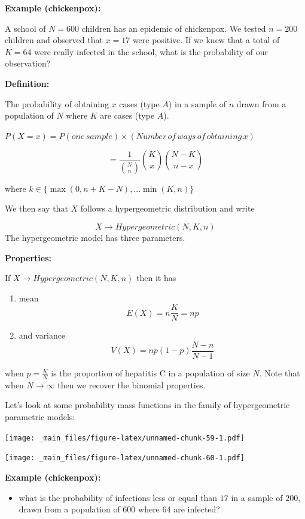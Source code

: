 \documentclass[
]{book}
\providecommand{\tightlist}{%
  \setlength{\itemsep}{0pt}\setlength{\parskip}{0pt}}
\begin{document}
\textbf{Example (chickenpox):}

A school of \(N=600\) children has an epidemic of chickenpox. We tested \(n=200\) children and observed that \(x=17\) were positive. If we knew that a total of \(K=64\) were really infected in the school, what is the probability of our observation?

\textbf{Definition:}

The probability of obtaining \(x\) cases (type \(A\)) in a sample of \(n\) drawn from a population of \(N\) where \(K\) are cases (type \(A\)).

\(P(X=x)=P(one\,sample) \times (Number\, of\, ways\, of\, obtaining\, x)\)

\[=\frac{1}{\binom N n}\binom K x \binom {N-K} {n-x}\]

where \(k \in \{\max(0, n+K-N), ... \min(K, n) \}\)

We then say that \(X\) follows a hypergeometric distribution and write

\[X \rightarrow Hypergeometric(N,K,n)\]
The hypergeometric model has three parameters.

\textbf{Properties:}

If \(X \rightarrow Hypergeometric(N,K,n)\) then it has

\begin{enumerate}
\def\labelenumi{\arabic{enumi})}
\item
  mean \[E(X) =  n  \frac{K}{N} = np\]
\item
  and variance \[V(X) = np(1-p)\frac{N-n}{N-1}\]
\end{enumerate}

when \(p=\frac{K}{N}\) is the proportion of hepatitis C in a population of size \(N\). Note that when \(N \rightarrow \infty\) then we recover the binomial properties.

Let's look at some probability mass functions in the family of hypergeometric parametric models:

\texttt{[image: \_main\_files/figure-latex/unnamed-chunk-59-1.pdf]}

\texttt{[image: \_main\_files/figure-latex/unnamed-chunk-60-1.pdf]}

\textbf{Example (chickenpox):}

\begin{itemize}
\tightlist
\item
  what is the probability of infections less or equal than \(17\) in a sample of \(200\), drawn from a population of \(600\) where \(64\) are infected?
\end{itemize}
\end{document}
